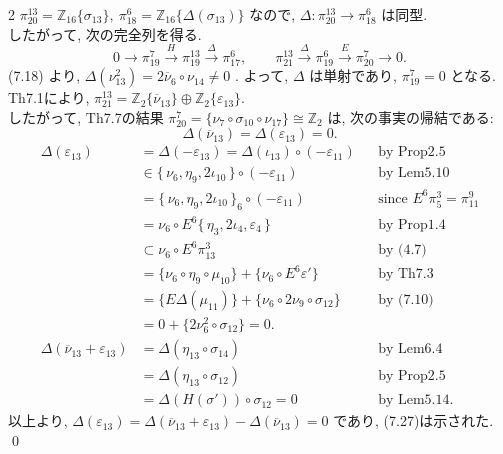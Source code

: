 \documentclass[10pt, leqno]{ltjsarticle}
\newcommand{\ov}[1]{\overline{#1}}
\newcommand{\toda}[1]{\{\,#1\,\}}              %
\newcommand{\todai}[2][]{\{\,#2\,\}_{#1}}      %
\newcommand{\gen}[1]{\{#1\}}       %
\newcommand{\pit}[2]{\pi_{#1}^{#2}}
\numberwithin{equation}{section}
\theoremstyle{plain}
\theoremstyle{definition}
\theoremstyle{remark}
\begin{document}
\begin{paracol}{2}
\(\pit{20}{13} = \mathbb{Z}_{16}\gen{\sigma_{13}},\ 
\pit{18}{6} = \mathbb{Z}_{16}\gen{\Delta(\sigma_{13})}\)
なので, 
\(\Delta:\pi_{20}^{13}\to\pi_{18}^{6}\) は同型.\\ 
したがって, 次の完全列を得る. 
\[
0\longrightarrow \pi_{19}^{7}\xrightarrow{\,H\,}\pi_{19}^{13}\xrightarrow{\,\Delta\,}\pi_{17}^{6},
\qquad
\pi_{21}^{13}\xrightarrow{\,\Delta\,}\pi_{19}^{6}\xrightarrow{\,E\,}\pi_{20}^{7}\longrightarrow 0 .
\]
(7.18) より, 
\(\Delta(\nu_{13}^2) = 2\overline{\nu}_6\circ\nu_{14}\ne0\) .
よって, \(\Delta\) は単射であり, \(\pi_{19}^{7}=0\) となる. \\
Th7.1により, 
 \(\pit{21}{13} = 
 \mathbb{Z}_2\gen{\ov{\nu}_{13}}\oplus
 \mathbb{Z}_2\gen{\varepsilon_{13}}\).\\
したがって, Th7.7の結果
\(
\pi_{20}^{7}=\gen{\nu_{7}\circ\sigma_{10}\circ\nu_{17}}\cong\mathbb{Z}_2
\)
は, 次の事実の帰結である:
\begin{equation}
\Delta(\overline{\nu}_{13})=\Delta(\varepsilon_{13})=0.
\end{equation}
\because
\[
\begin{align*}
\Delta(\varepsilon_{13})
& = \Delta(-\varepsilon_{13})
=\Delta(\iota_{13})\circ(-\varepsilon_{11})
&& \text{by Prop2.5}\\
& \in \toda{\nu_6,\eta_9,2\iota_{10}}\circ(-\varepsilon_{11})
&& \text{by Lem5.10}\\
& = \todai[6]{\nu_6, \eta_9, 2\iota_{10}} \circ (-\varepsilon_{11})
&& \text{since } E^6\pit{5}{3} = \pit{11}{9}\\
& = \nu_6\circ E^6\toda{\eta_3,2\iota_4,\varepsilon_4}
&& \text{by Prop1.4}\\
& \subset \nu_6\circ E^6\pit{13}{3}
&& \text{by (4.7)}\\
& = \gen{\nu_6\circ\eta_9\circ\mu_{10}} + \gen{\nu_6\circ E^6\varepsilon'}
&& \text{by Th7.3}\\
& = \gen{E\Delta(\mu_{11})} + \gen{\nu_6\circ2\nu_9 \circ\sigma_{12}}
&& \text{by (7.10)}\\
& = 0 + \gen{2\nu_6^2\circ\sigma_{12}} = 0.\\
\Delta(\ov{\nu}_{13} + \varepsilon_{13})
& = \Delta(\eta_{13}\circ\sigma_{14}) 
&& \text{by Lem6.4}\\
& = \Delta(\eta_{13}\circ\sigma_{12})
&& \text{by Prop2.5}\\
& = \Delta(H(\sigma')) \circ \sigma_{12} = 0
&& \text{by Lem5.14.}
\end{align*}
\]
以上より, 
\(
\Delta(\varepsilon_{13}) 
= \Delta(\overline{\nu}_{13}+\varepsilon_{13})-\Delta(\overline{\nu}_{13})=0
\)
であり, (7.27)は示された. 
\qed


\end{paracol}
\end{document}
